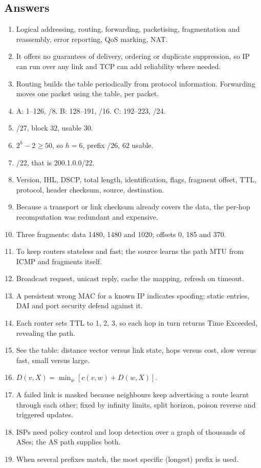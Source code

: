 \documentclass[11pt,a4paper]{article}
\begin{document}
\subsection*{Answers}
\begin{enumerate}
\item Logical addressing, routing, forwarding, packetising, fragmentation and reassembly, error reporting, QoS marking, NAT.
\item It offers no guarantees of delivery, ordering or duplicate suppression, so IP can run over any link and TCP can add reliability where needed.
\item Routing builds the table periodically from protocol information. Forwarding moves one packet using the table, per packet.
\item A: 1--126, /8. B: 128--191, /16. C: 192--223, /24.
\item /27, block 32, usable 30.
\item $2^h - 2 \ge 50$, so $h = 6$, prefix /26, 62 usable.
\item /22, that is 200.1.0.0/22.
\item Version, IHL, DSCP, total length, identification, flags, fragment offset, TTL, protocol, header checksum, source, destination.
\item Because a transport or link checksum already covers the data, the per-hop recomputation was redundant and expensive.
\item Three fragments: data 1480, 1480 and 1020; offsets 0, 185 and 370.
\item To keep routers stateless and fast; the source learns the path MTU from ICMP and fragments itself.
\item Broadcast request, unicast reply, cache the mapping, refresh on timeout.
\item A persistent wrong MAC for a known IP indicates spoofing; static entries, DAI and port security defend against it.
\item Each router sets TTL to 1, 2, 3, so each hop in turn returns Time Exceeded, revealing the path.
\item See the table: distance vector versus link state, hops versus cost, slow versus fast, small versus large.
\item $D(v,X) = \min_w [c(v,w) + D(w,X)]$.
\item A failed link is masked because neighbours keep advertising a route learnt through each other; fixed by infinity limits, split horizon, poison reverse and triggered updates.
\item ISPs need policy control and loop detection over a graph of thousands of ASes; the AS path supplies both.
\item When several prefixes match, the most specific (longest) prefix is used.
\end{enumerate}
\end{document}
